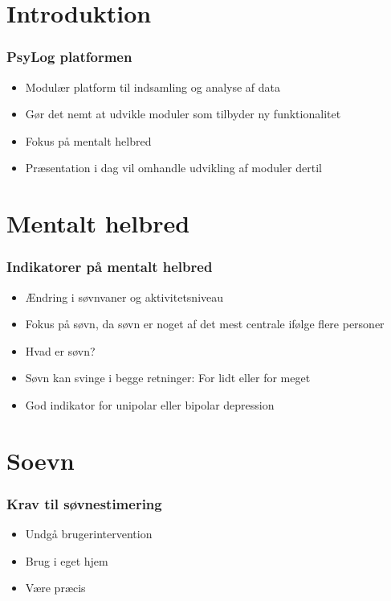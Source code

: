 \section{Introduktion}
\begin{frame}
\frametitle{PsyLog platformen}
	\begin{itemize}
	\item Modulær platform til indsamling og analyse af data
	\item Gør det nemt at udvikle moduler som tilbyder ny funktionalitet
	\item Fokus på mentalt helbred
	\item Præsentation i dag vil omhandle udvikling af moduler dertil
	\end{itemize}
\end{frame}

\section{Mentalt helbred}
\begin{frame}
\frametitle{Indikatorer på mentalt helbred}
	\begin{itemize}
	\item Ændring i søvnvaner og aktivitetsniveau
	\item Fokus på søvn, da søvn er noget af det mest centrale ifølge flere personer
	\item Hvad er søvn? %
	\item Søvn kan svinge i begge retninger: For lidt eller for meget
	\item God indikator for unipolar eller bipolar depression
	\end{itemize}
\end{frame}

\section{Soevn}
\begin{frame}
\frametitle{Krav til søvnestimering}
	\begin{itemize}
	\item Undgå brugerintervention
	\item Brug i eget hjem
	\item Være præcis
	\end{itemize}
\end{frame}

